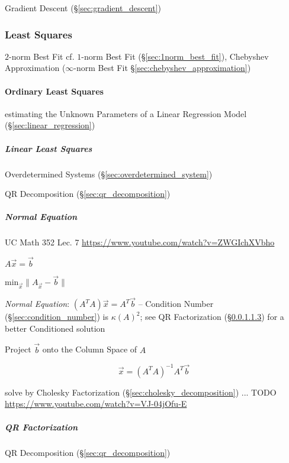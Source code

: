 Gradient Descent (\S\ref{sec:gradient_descent})



\subsubsection{Least Squares}\label{sec:least_squares}

$2$-norm Best Fit \fist cf. $1$-norm Best Fit (\S\ref{sec:1norm_best_fit}),
Chebyshev Approximation ($\infty$-norm Best Fit
\S\ref{sec:chebyshev_approximation})



\paragraph{Ordinary Least Squares}\label{sec:ordinary_least_squares}\hfill

estimating the Unknown Parameters of a Linear Regression Model
(\S\ref{sec:linear_regression})



\subparagraph{Linear Least Squares}\label{sec:linear_least_squares}\hfill

Overdetermined Systems (\S\ref{sec:overdetermined_system})

QR Decomposition (\S\ref{sec:qr_decomposition})



\subparagraph{Normal Equation}\label{sec:normal_equation}\hfill

UC Math 352 Lec. 7 \url{https://www.youtube.com/watch?v=ZWGIchXVbho}

$A\vec{x} = \vec{b}$

$\mathrm{min}_{\vec{x}} \|A_{\vec{x}} - \vec{b}\|$

\emph{Normal Equation}: $(A^TA)\vec{x} = A^T\vec{b}$ -- Condition Number
(\S\ref{sec:condition_number}) is $\kappa(A)^2$; see QR Factorization
(\S\ref{sec:qr_factorization}) for a better Conditioned solution

Project $\vec{b}$ onto the Column Space of $A$

\[
  \vec{x} = (A^TA)^{-1}A^T\vec{b}
\]

solve by Cholesky Factorization (\S\ref{sec:cholesky_decomposition}) ... TODO
\url{https://www.youtube.com/watch?v=VJ-04jOfu-E}



\subparagraph{QR Factorization}\label{sec:qr_factorization}\hfill

QR Decomposition (\S\ref{sec:qr_decomposition})

